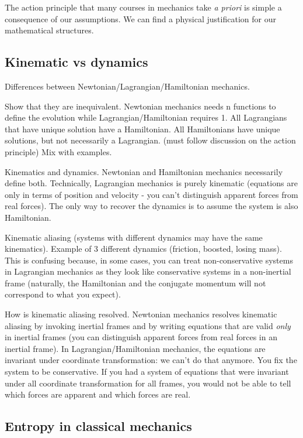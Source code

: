 \documentclass{article}
\begin{document}
The action principle that many courses in mechanics take \emph{a priori} is simple a consequence of our assumptions. We can find a physical justification for our mathematical structures.

\subsection{Kinematic vs dynamics}

Differences between Newtonian/Lagrangian/Hamiltonian mechanics.

Show that they are inequivalent. Newtonian mechanics needs n functions to define the evolution while Lagrangian/Hamiltonian requires 1. All Lagrangians that have unique solution have a Hamiltonian. All Hamiltonians have unique solutions, but not necessarily a Lagrangian. (must follow discussion on the action principle) Mix with examples.

Kinematics and dynamics. Newtonian and Hamiltonian mechanics necessarily define both. Technically, Lagrangian mechanics is purely kinematic (equations are only in terms of position and velocity - you can't distinguish apparent forces from real forces). The only way to recover the dynamics is to assume the system is also Hamiltonian.

Kinematic aliasing (systems with different dynamics may have the same kinematics). Example of 3 different dynamics (friction, boosted, losing mass). This is confusing because, in some cases, you can treat non-conservative systems in Lagrangian mechanics as they look like conservative systems in a non-inertial frame (naturally, the Hamiltonian and the conjugate momentum will not correspond to what you expect).

How is kinematic aliasing resolved. Newtonian mechanics resolves kinematic aliasing by invoking inertial frames and by writing equations that are valid \emph{only} in inertial frames (you can distinguish apparent forces from real forces in an inertial frame).  In Lagrangian/Hamiltonian mechanics, the equations are invariant under coordinate transformation: we can't do that anymore. You fix the system to be conservative. If you had a system of equations that were invariant under all coordinate transformation for all frames, you would not be able to tell which forces are apparent and which forces are real.

\subsection{Entropy in classical mechanics}
\end{document}
